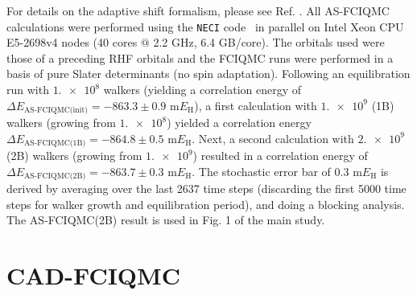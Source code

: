 \documentclass[journal=jcp,manuscript=suppinfo]{achemso}
\begin{document}
For details on the adaptive shift formalism, please see Ref. . All AS-FCIQMC calculations were performed using the {\texttt{NECI}} code~\cite{neci} in parallel on Intel Xeon CPU E5-2698v4 nodes (40 cores $@$ 2.2 GHz, 6.4 GB/core). The orbitals used were those of a preceding RHF orbitals and the FCIQMC runs were performed in a basis of pure Slater determinants (no spin adaptation). Following an equilibration run with $\num{1.e8}$ walkers (yielding a correlation energy of $\Delta E_{\text{AS-FCIQMC(init)}} = -863.3\pm0.9$ m$E_{\text{H}}$), a first calculation with $\num{1.e9}$ (1B) walkers (growing from $\num{1.e8}$) yielded a correlation energy $\Delta E_{\text{AS-FCIQMC(1B)}} = -864.8\pm0.5$ m$E_{\text{H}}$. Next, a second calculation with $\num{2.e9}$ (2B) walkers (growing from $\num{1.e9}$) resulted in a correlation energy of $\Delta E_{\text{AS-FCIQMC(2B)}} = -863.7\pm0.3$ m$E_{\text{H}}$. The stochastic error bar of $0.3$ m$E_{\text{H}}$ is derived by averaging over the last 2637 time steps (discarding the first 5000 time steps for walker growth and equilibration period), and doing a blocking analysis. The AS‐FCIQMC(2B) result is used in Fig. 1 of the main study.

\section{CAD-FCIQMC}
\end{document}
